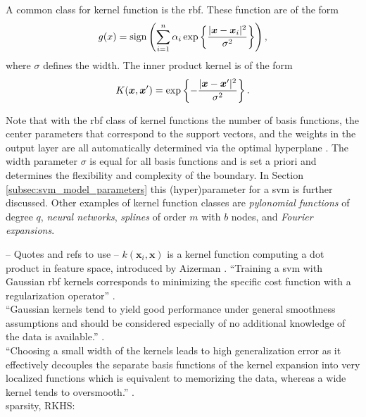 A common class for kernel function is the \acrlong{rbf}.
These function are of the form
\begin{equation}
  g(x) = \operatorname*{sign} \left(  \sum_{i=1}^{n} \alpha_i \operatorname*{exp} \left\{ \frac{|\vectorsym{x} - \vectorsym{x}_i|^2}{\sigma^2} \right\} \right),
\end{equation}
where $\sigma$ defines the width.
The inner product kernel is of the form
\begin{equation}
  K(\vectorsym{x}, \vectorsym{x}') = \operatorname*{exp} \left\{ - \frac{| \vectorsym{x} - \vectorsym{x}'|^2}{\sigma^2} \right\}.
\end{equation}

Note that with the \gls{rbf} class of kernel functions the number of basis functions, the center parameters that correspond to the support vectors, and the weights in the output layer are all automatically determined via the optimal hyperplane \cite{cherkassky2007learning}.
The width parameter $\sigma$ is equal for all basis functions and is set a priori and determines the flexibility and complexity of the boundary.
In Section \ref{subsec:svm_model_parameters} this (hyper)parameter for a \gls{svm} is further discussed.
Other examples of kernel function classes are \emph{pylonomial functions} of degree $q$, \emph{neural networks}, \emph{splines} of order $m$ with $b$ nodes, and \emph{Fourier expansions}.

-- Quotes and refs to use --
$k(\mathbf{x}_i, \mathbf{x})$ is a kernel function computing a dot product in feature space, introduced by Aizerman \etal \cite{aizerman1964theoretical}.
``Training a \gls{svm} with Gaussian \gls{rbf} kernels corresponds to minimizing the specific cost function with a regularization operator'' \cite{smola1998connection}. \\
``Gaussian kernels tend to yield good performance under general smoothness assumptions and should be considered especially of no additional knowledge of the data is available.'' \cite{smola1998connection}. \\
``Choosing a small width of the kernels leads to high generalization error as it effectively decouples the separate basis functions of the kernel expansion into very localized functions which is equivalent to memorizing the data, whereas a wide kernel tends to oversmooth.'' \cite{smola1998connection}. \\

sparsity, RKHS: \cite{girosi1998equivalence}



